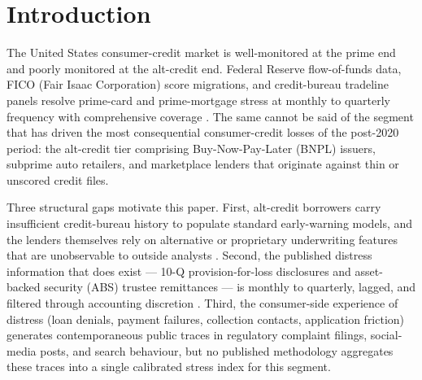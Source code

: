 \documentclass[11pt,a4paper]{article}
\begin{document}
\clearpage

\tableofcontents

\clearpage

\section{Introduction}\label{sec:intro}

The United States consumer-credit market is well-monitored at the prime end and poorly monitored at the alt-credit end. Federal Reserve flow-of-funds data, FICO (Fair Isaac Corporation) score migrations, and credit-bureau tradeline panels resolve prime-card and prime-mortgage stress at monthly to quarterly frequency with comprehensive coverage \citep{frb2023householdcredit}. The same cannot be said of the segment that has driven the most consequential consumer-credit losses of the post-2020 period: the alt-credit tier comprising Buy-Now-Pay-Later (BNPL) issuers, subprime auto retailers, and marketplace lenders that originate against thin or unscored credit files.

Three structural gaps motivate this paper. First, alt-credit borrowers carry insufficient credit-bureau history to populate standard early-warning models, and the lenders themselves rely on alternative or proprietary underwriting features that are unobservable to outside analysts \citep{difilippo2018marketplace}. Second, the published distress information that does exist --- 10-Q provision-for-loss disclosures and asset-backed security (ABS) trustee remittances --- is monthly to quarterly, lagged, and filtered through accounting discretion \citep{adelinoschoar2016}. Third, the consumer-side experience of distress (loan denials, payment failures, collection contacts, application friction) generates contemporaneous public traces in regulatory complaint filings, social-media posts, and search behaviour, but no published methodology aggregates these traces into a single calibrated stress index for this segment.
\end{document}
